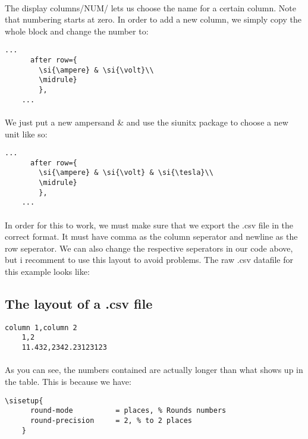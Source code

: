   \paragraph{}
  The display columns/NUM/ lets us choose the name for a certain column. Note that numbering starts at zero. In order to add a new column, we simply copy the whole block and change the number to:
  \begin{lstlisting}[language={[LaTeX]TeX},breaklines=true,frame=single]
    ...
      after row={
        \si{\ampere} & \si{\volt}\\
        \midrule}
        },
    ...
  \end{lstlisting}
  \paragraph{}
  We just put a new ampersand \& and use the siunitx package
  to choose a new unit like so:
  \begin{lstlisting}[language={[LaTeX]TeX},breaklines=true,frame=single]
    ...
      after row={
        \si{\ampere} & \si{\volt} & \si{\tesla}\\
        \midrule}
        },
    ...
  \end{lstlisting}
  \paragraph{}
  In order for this to work, we must make sure that we export the .csv file in the correct format. It must have comma as the column seperator and newline as the row seperator. We can also change the respective seperators in our code above, but i recomment to use this layout to avoid problems. The raw .csv datafile for this example looks like:

  \subsection{The layout of a .csv file} 
  \begin{lstlisting}[language={[LaTeX]TeX},breaklines=true,frame=single]
    column 1,column 2
    1,2
    11.432,2342.23123123
  \end{lstlisting}
  \paragraph{}
  As you can see, the numbers contained are actually longer than what shows up in the table. This is because we have:
  \begin{lstlisting}[language={[LaTeX]TeX},breaklines=true,frame=single]
    \sisetup{
      round-mode          = places, % Rounds numbers
      round-precision     = 2, % to 2 places
    }
  \end{lstlisting}
